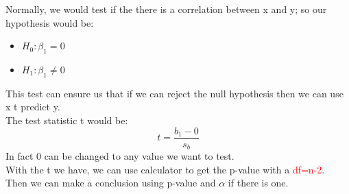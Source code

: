 Normally, we would test if the there is a correlation between x and y; so our hypothesis would be:
\begin{itemize}
    \item \(H_0: \beta_1=0\)
    \item \(H_1: \beta_1\neq0\)
\end{itemize}
This test can ensure us that if we can reject the null hypothesis then we can use x t predict y. \\
The test statistic t would be:
\begin{equation}
    t=\frac{b_1-0}{s_b}
\end{equation}
In fact 0 can be changed to any value we want to test.\\
With the t we have, we can use calculator to get the p-value with a \textcolor{red}{df=n-2}.\\
Then we can make a conclusion using p-value and \(\alpha\) if there is one.
